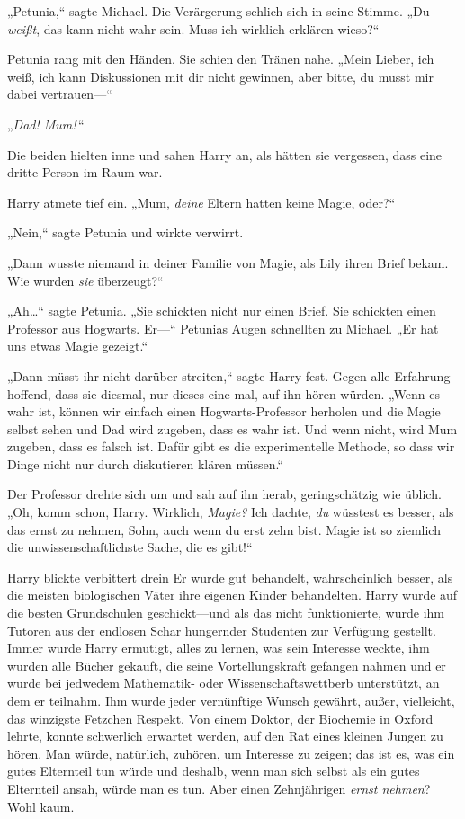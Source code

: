 {„Petunia,“ sagte Michael. Die Verärgerung schlich sich in seine Stimme. „Du \emph{weißt}, das kann nicht wahr sein. Muss ich wirklich erklären wieso?“

Petunia rang mit den Händen. Sie schien den Tränen nahe. „Mein Lieber, ich weiß, ich kann Diskussionen mit dir nicht gewinnen, aber bitte, du musst mir dabei vertrauen—“

„\emph{Dad! Mum!}\,“

Die beiden hielten inne und sahen Harry an, als hätten sie vergessen, dass eine dritte Person im Raum war.

Harry atmete tief ein. „Mum, \emph{deine} Eltern hatten keine Magie, oder?“

„Nein,“ sagte Petunia und wirkte verwirrt.

„Dann wusste niemand in deiner Familie von Magie, als Lily ihren Brief bekam. Wie wurden \emph{sie} überzeugt?“

„Ah…“ sagte Petunia. „Sie schickten nicht nur einen Brief. Sie schickten einen Professor aus Hogwarts. Er—“ Petunias Augen schnellten zu Michael. „Er hat uns etwas Magie gezeigt.“

„Dann müsst ihr nicht darüber streiten,“ sagte Harry fest. Gegen alle Erfahrung hoffend, dass sie diesmal, nur dieses eine mal, auf ihn hören würden. „Wenn es wahr ist, können wir einfach einen Hogwarts-Professor herholen und die Magie selbst sehen und Dad wird zugeben, dass es wahr ist. Und wenn nicht, wird Mum zugeben, dass es falsch ist. Dafür gibt es die experimentelle Methode, so dass wir Dinge nicht nur durch diskutieren klären müssen.“

Der Professor drehte sich um und sah auf ihn herab, geringschätzig wie üblich. „Oh, komm schon, Harry. Wirklich, \emph{Magie?} Ich dachte, \emph{du} wüsstest es besser, als das ernst zu nehmen, Sohn, auch wenn du erst zehn bist. Magie ist so ziemlich die unwissenschaftlichste Sache, die es gibt!“

Harry blickte verbittert drein Er wurde gut behandelt, wahrscheinlich besser, als die meisten biologischen Väter ihre eigenen Kinder behandelten. Harry wurde auf die besten Grundschulen geschickt—und als das nicht funktionierte, wurde ihm Tutoren aus der endlosen Schar hungernder Studenten zur Verfügung gestellt. Immer wurde Harry ermutigt, alles zu lernen, was sein Interesse weckte, ihm wurden alle Bücher gekauft, die seine Vortellungskraft gefangen nahmen und er wurde bei jedwedem Mathematik- oder Wissenschaftswettberb unterstützt, an dem er teilnahm. Ihm wurde jeder vernünftige Wunsch gewährt, außer, vielleicht, das winzigste Fetzchen Respekt. Von einem Doktor, der Biochemie in Oxford lehrte, konnte schwerlich erwartet werden, auf den Rat eines kleinen Jungen zu hören. Man würde, natürlich, zuhören, um Interesse zu zeigen; das ist es, was ein gutes Elternteil tun würde und deshalb, wenn man sich selbst als ein gutes Elternteil ansah, würde man es tun. Aber einen Zehnjährigen \emph{ernst nehmen}? Wohl kaum.

}
